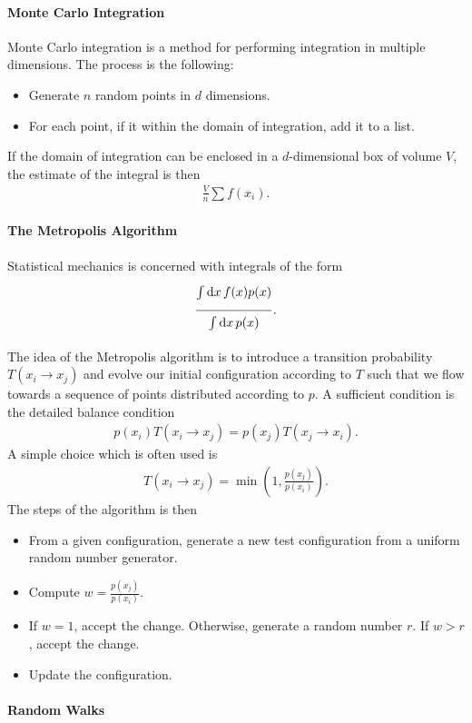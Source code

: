 \paragraph{Monte Carlo Integration}
Monte Carlo integration is a method for performing integration in multiple dimensions. The process is the following:
\begin{itemize}
	\item Generate $n$ random points in $d$ dimensions.
	\item For each point, if it within the domain of integration, add it to a list.
\end{itemize}
If the domain of integration can be enclosed in a $d$-dimensional box of volume $V$, the estimate of the integral is then
\begin{align*}
	\frac{V}{n}\sum f(x_{i}).
\end{align*}

\paragraph{The Metropolis Algorithm}
Statistical mechanics is concerned with integrals of the form
\begin{align*}
	\frac{\int\limits_{}^{}\dd{x}f(x)p(x)}{\int\limits_{}^{}\dd{x}p(x)}.
\end{align*}
The idea of the Metropolis algorithm is to introduce a transition probability $T(x_{i}\to x_{j})$ and evolve our initial configuration according to $T$ such that we flow towards a sequence of points distributed according to $p$. A sufficient condition is the detailed balance condition
\begin{align*}
	p(x_{i})T(x_{i}\to x_{j}) = p(x_{j})T(x_{j}\to x_{i}).
\end{align*}
A simple choice which is often used is
\begin{align*}
	T(x_{i}\to x_{j}) = \min(1, \frac{p(x_{j})}{p(x_{i})}).
\end{align*}
The steps of the algorithm is then
\begin{itemize}
	\item From a given configuration, generate a new test configuration from a uniform random number generator.
	\item Compute $w = \frac{p(x_{j})}{p(x_{i})}$.
	\item If $w = 1$, accept the change. Otherwise, generate a random number $r$. If $w > r$, accept the change.
	\item Update the configuration.
\end{itemize}

\paragraph{Random Walks}
